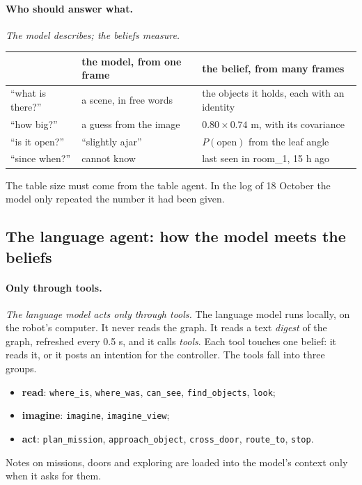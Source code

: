 \documentclass[11pt]{article}
\newcommand{\slt}[1]{\emph{#1}}   %
\begin{document}
\paragraph{Who should answer what.} \slt{The model describes; the beliefs measure.}
\begin{center}\small
\begin{tabular}{@{}p{2.6cm} p{4.6cm} p{6.4cm}@{}}
\toprule
 & the model, from one frame & the belief, from many frames\\\midrule
``what is there?'' & a scene, in free words & the objects it holds, each with an identity\\
``how big?'' & a guess from the image & $0.80\times0.74$ m, with its covariance\\
``is it open?'' & ``slightly ajar'' & $P(\text{open})$ from the leaf angle\\
``since when?'' & cannot know & last seen in room\_1, 15 h ago\\
\bottomrule
\end{tabular}
\end{center}
The table size must come from the table agent. In the log of 18 October the model only repeated the number it had been given.

\subsection{The language agent: how the model meets the beliefs}

\paragraph{Only through tools.} \slt{The language model acts only through tools.} The language model runs locally, on the robot's computer. It never reads the graph. It reads a text \emph{digest} of the graph, refreshed every 0.5 s, and it calls \emph{tools}. Each tool touches one belief: it reads it, or it posts an intention for the controller. The tools fall into three groups.
\begin{itemize}
\item \textbf{read}: \texttt{where\_is}, \texttt{where\_was}, \texttt{can\_see}, \texttt{find\_objects}, \texttt{look};
\item \textbf{imagine}: \texttt{imagine}, \texttt{imagine\_view};
\item \textbf{act}: \texttt{plan\_mission}, \texttt{approach\_object}, \texttt{cross\_door}, \texttt{route\_to}, \texttt{stop}.
\end{itemize}
Notes on missions, doors and exploring are loaded into the model's context only when it asks for them.
\end{document}
